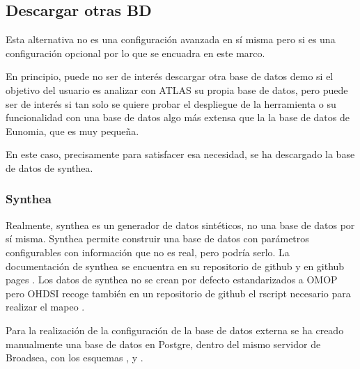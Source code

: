 \subsection{Descargar otras BD} \label{subsec:04OtrasBD}

Esta alternativa no es una configuración avanzada en sí misma pero si es una configuración opcional por lo que se encuadra en este marco. 

En principio, puede no ser de interés descargar otra base de datos demo si el objetivo del usuario es analizar con ATLAS su propia base de datos, pero puede ser de interés si tan solo se quiere probar el despliegue de la herramienta o su funcionalidad con una base de datos algo más extensa que la la base de datos de Eunomia, que es muy pequeña.

En este caso, precisamente para satisfacer esa necesidad, se ha descargado la base de datos de synthea.

\subsubsection{Synthea}

Realmente, synthea es un generador de datos sintéticos, no una base de datos por sí misma. Synthea permite construir una base de datos con parámetros configurables con información que no es real, pero podría serlo. La documentación de synthea se encuentra en su repositorio de github \cite{githubSynthea} y en github pages \cite{githubPagesSynthea}. Los datos de synthea no se crean por defecto estandarizados a OMOP pero OHDSI recoge también en un repositorio de github el rscript necesario para realizar el mapeo \cite{githubETLSynthea}.

Para la realización de la configuración de la base de datos externa se ha creado manualmente una base de datos en Postgre, dentro del mismo servidor de Broadsea, con los esquemas ,  y . 